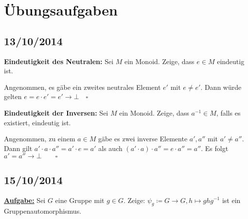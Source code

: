 \documentclass[10pt,a4paper]{article}
\begin{document}
\newpage
\section{Übungsaufgaben}

\subsection{13/10/2014}

\textbf{Eindeutigkeit des Neutralen:} Sei $M$ ein Monoid. Zeige, dass $e \in M$ eindeutig ist.\bigskip

Angenommen, es gäbe ein zweites neutrales Element $e'$ mit $e \neq e'$. Dann würde gelten $e = e \cdot e' = e' \rightarrow \bot \quad \square$\bigskip

\textbf{Eindeutigkeit der Inversen:} Sei $M$ ein Monoid. Zeige, dass $a^{-1} \in M$, falls es existiert, eindeutig ist.\bigskip

Angenommen, zu einem $a \in M$ gäbe es zwei inverse Elemente $a', a''$ mit $a' \neq a''$. Dann gilt $a' \cdot a \cdot a''= a' \cdot e = a'$ als auch $(a' \cdot a) \cdot a'' = e \cdot a'' = a''$. Es folgt $a' = a'' \rightarrow \bot \qquad \square$

\subsection{15/10/2014}

\textbf{\underline{Aufgabe:}} Sei $G$ eine Gruppe mit $g \in G$. Zeige: $\psi_g \coloneqq G \to G, h \mapsto g h g^{-1}$ ist ein Gruppenautomorphismus.
\end{document}
